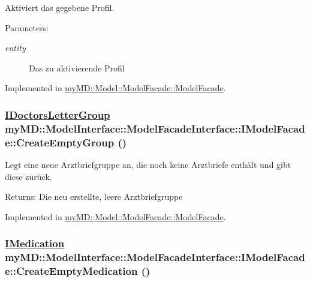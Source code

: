 Aktiviert das gegebene Profil. 

\begin{Desc}
\item[Parameters:]
\begin{description}
\item[{\em entity}]Das zu aktivierende Profil\end{description}
\end{Desc}


Implemented in \hyperlink{classmy_m_d_1_1_model_1_1_model_facade_1_1_model_facade_6ffa7bbff9bc4db881433251a158fbd0}{my\-MD::Model::Model\-Facade::Model\-Facade}.\hypertarget{interfacemy_m_d_1_1_model_interface_1_1_model_facade_interface_1_1_i_model_facade_7ce2fe6e33d0a78829c47a6b2f35e0fe}{
\subsubsection[CreateEmptyGroup]{\setlength{\rightskip}{0pt plus 5cm}\hyperlink{interfacemy_m_d_1_1_model_interface_1_1_data_model_interface_1_1_i_doctors_letter_group}{IDoctors\-Letter\-Group} my\-MD::Model\-Interface::Model\-Facade\-Interface::IModel\-Facade::Create\-Empty\-Group ()}}
\label{de/d3e/interfacemy_m_d_1_1_model_interface_1_1_model_facade_interface_1_1_i_model_facade_7ce2fe6e33d0a78829c47a6b2f35e0fe}


Legt eine neue Arztbriefgruppe an, die noch keine Arztbriefe enth\"{a}lt und gibt diese zur\"{u}ck. 

\begin{Desc}
\item[Returns:]Die neu erstellte, leere Arztbriefgruppe\end{Desc}


Implemented in \hyperlink{classmy_m_d_1_1_model_1_1_model_facade_1_1_model_facade_7ce2fe6e33d0a78829c47a6b2f35e0fe}{my\-MD::Model::Model\-Facade::Model\-Facade}.\hypertarget{interfacemy_m_d_1_1_model_interface_1_1_model_facade_interface_1_1_i_model_facade_3fd69c99a27372f99eae3cda6e23e2e6}{
\subsubsection[CreateEmptyMedication]{\setlength{\rightskip}{0pt plus 5cm}\hyperlink{interfacemy_m_d_1_1_model_interface_1_1_data_model_interface_1_1_i_medication}{IMedication} my\-MD::Model\-Interface::Model\-Facade\-Interface::IModel\-Facade::Create\-Empty\-Medication ()}}
\label{de/d3e/interfacemy_m_d_1_1_model_interface_1_1_model_facade_interface_1_1_i_model_facade_3fd69c99a27372f99eae3cda6e23e2e6}


